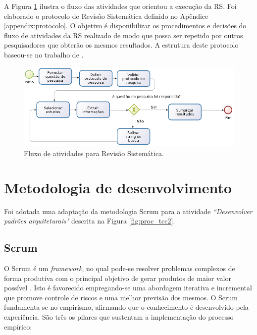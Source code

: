 
A Figura \ref{fig:processo_rs} ilustra o fluxo das atividades que orientou a execução da RS. Foi elaborado o protocolo de Revisão Sistemática definido no Apêndice \ref{appendix:protocolo}. O objetivo é disponibilizar os procedimentos e decisões do fluxo de atividades da RS realizado de modo que possa ser repetido por outros pesquisadores que obterão os mesmos resultados. A estrutura deste protocolo baseou-se no trabalho de .

\begin{figure}[!htb]
    \centering
    \includegraphics[scale=0.5]{figuras/processo_rs}
    \caption{Fluxo de atividades para Revisão Sistemática.}
    \label{fig:processo_rs}     
\end{figure}


\section{Metodologia de desenvolvimento} \label{sec:metodologia_desenvolvimento}

Foi adotada uma adaptação da metodologia Scrum para a atividade \textit{``Desenvolver padrões arquiteturais"} descrita na Figura \ref{fig:proc_tcc2}. 

\subsection{Scrum} \label{sec:scrum}

O Scrum é um \textit{framework}, no qual pode-se resolver problemas complexos de forma produtiva com o principal objetivo de gerar produtos de maior valor possível \cite{schwaber2016}. Isto é favorecido empregando-se uma abordagem iterativa e incremental que promove controle de riscos e uma melhor previsão dos mesmos. O Scrum fundamenta-se no empirismo, afirmando que o conhecimento é desenvolvido pela experiência. São três os pilares que sustentam a implementação do processo empírico:

